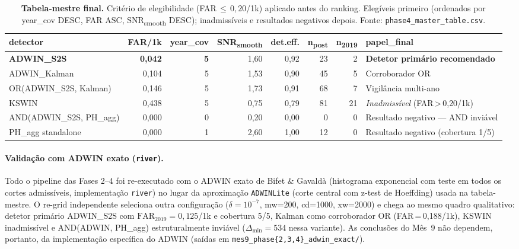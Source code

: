 \documentclass[11pt,a4paper]{article}
\begin{document}
\begin{table}[H]
\centering\scriptsize
\begin{tabular}{l r r r r r r l}
\toprule
\textbf{detector} & \textbf{FAR/1k} & \textbf{year\_cov} & \textbf{SNR\textsubscript{smooth}} & \textbf{det.eff.} & \textbf{n\textsubscript{post}} & \textbf{n\textsubscript{2019}} & \textbf{papel\_final} \\
\midrule
\textbf{ADWIN\_S2S}            & \textbf{0{,}042} & \textbf{5} & 1{,}60 & 0{,}92 & 23 & 2 & \textbf{Detetor prim\'ario recomendado} \\
ADWIN\_Kalman                  & 0{,}104 & 5 & 1{,}53 & 0{,}90 & 45 & 5 & Corroborador OR \\
OR(ADWIN\_S2S, Kalman)         & 0{,}146 & 5 & 1{,}73 & 0{,}91 & 68 & 7 & Vigil\^ancia multi-ano \\
KSWIN                          & 0{,}438 & 5 & 0{,}75 & 0{,}79 & 81 & 21 & \emph{Inadmiss\'ivel} (FAR\,>\,0{,}20/1k) \\
AND(ADWIN\_S2S, PH\_agg)       & 0{,}000 & 0 & 0{,}20 & 0{,}00 & 0  & 0 & Resultado negativo --- AND invi\'avel \\
PH\_agg standalone             & 0{,}000 & 1 & 2{,}60 & 1{,}00 & 12 & 0 & Resultado negativo (cobertura 1/5) \\
\bottomrule
\end{tabular}
\caption{\textbf{Tabela-mestre final.} Crit\'erio de elegibilidade
         (FAR\,$\leq\,0{,}20$/1k) aplicado antes do ranking. Eleg\'iveis
         primeiro (ordenados por year\_cov DESC, FAR ASC,
         SNR\textsubscript{smooth} DESC); inadmiss\'iveis e resultados
         negativos depois. Fonte: \texttt{phase4\_master\_table.csv}.}
\label{tab:m9_master}
\end{table}

\paragraph{Valida\c{c}\~ao com ADWIN exato (\texttt{river}).}
Todo o pipeline das Fases 2--4 foi re-executado com o ADWIN exato de
Bifet \& Gavald\`a \cite{adwin} (histograma exponencial com teste em
todos os cortes admiss\'iveis, implementa\c{c}\~ao \texttt{river}) no
lugar da aproxima\c{c}\~ao \texttt{ADWINLite} (corte central com z-test
de Hoeffding) usada na tabela-mestre. O re-grid independente seleciona
outra configura\c{c}\~ao ($\delta\!=\!10^{-7}$, mw=200, cd=1000,
xw=2000) e chega ao mesmo quadro qualitativo: detetor prim\'ario
ADWIN\_S2S com $\text{FAR}_{2019}\!=\!0{,}125$/1k e cobertura 5/5,
Kalman como corroborador OR (FAR\,=\,0{,}188/1k), KSWIN inadmiss\'ivel
e AND(ADWIN, PH\_agg) estruturalmente invi\'avel
($\Delta_{\min}\!=\!534$ nessa variante). As conclus\~oes do M\^es~9
n\~ao dependem, portanto, da implementa\c{c}\~ao espec\'ifica do ADWIN
(sa\'idas em \texttt{mes9\_phase\{2,3,4\}\_adwin\_exact/}).
\end{document}
